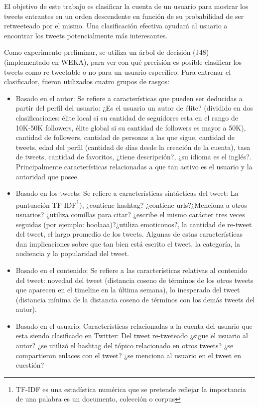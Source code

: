 El objetivo de este trabajo es clasificar la cuenta de un usuario para mostrar los tweets entrantes en un orden descendente en función de su probabilidad de ser retweeteado por el mismo. Una clasificación efectiva ayudará al usuario a encontrar los tweets potencialmente más interesantes. 

Como experimento preliminar, se utiliza un árbol de decisión (J48) (implementado en WEKA), para ver con qué precisión es posible clasificar los tweets como re-tweetable o no para un usuario específico. Para entrenar el clasificador, fueron utilizados cuatro grupos de rasgos:

\begin{itemize}
	\item Basado en el autor: Se refiere a características que pueden ser deducidas a partir del perfil del usuario: ¿Es el usuario un autor de élite? (dividido en dos clasificaciones: élite local si su cantidad de seguidores esta en el rango de 10K-50K followers, élite global si su cantidad de followers es mayor a 50K), cantidad de followers, cantidad de personas a las que sigue, cantidad de tweets,  edad del perfil (cantidad de días desde la creación de la cuenta), tasa de tweets, cantidad de favoritos, ¿tiene descripción?, ¿su idioma es el inglés?. Principalmente características relacionadas a que tan activo es el usuario y la autoridad que posee.
	
	\item Basado en los tweets: Se refiere a características sintácticas del tweet: La puntuación TF-IDF\footnote{TF-IDF es una estadística numérica que se pretende reflejar la importancia de una palabra es un documento, colección o corpus}), ¿contiene hashtag? ¿contiene urls?¿Menciona a otros usuarios? ¿utiliza comillas para citar? ¿escribe el mismo carácter tres veces seguidas (por ejemplo: hoolaaa)?¿utiliza emoticonos?, la cantidad de re-tweet del tweet, el largo promedio de los tweets. Algunas de estas características dan implicaciones sobre que tan bien está escrito el tweet, la categoría, la audiencia y la popularidad del tweet.
	\item Basado en el contenido: Se refiere a las características relativas al contenido del tweet: novedad del tweet (distancia coseno de términos de los otros tweets que aparecen en el timeline en la última semana), lo inesperado del tweet (distancia mínima de la distancia coseno de términos con los demás tweets del autor).
	\item Basado en el usuario: Características relacionadas a la cuenta del usuario que esta siendo clasificado en Twitter: Del tweet re-tweteado ¿sigue el usuario al autor? ¿se utilizó el hashtag del tópico relacionado en otros tweets? ¿se compartieron enlaces con el tweet? ¿se menciona al usuario en el tweet en cuestión?
\end{itemize}

